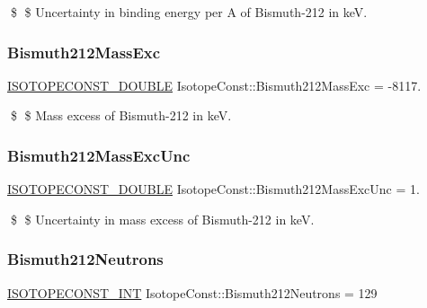 \$ \$ Uncertainty in binding energy per A of Bismuth-\/212 in keV. \mbox{\label{group___isotope_const-_bismuth-_bi212_ga6e482877de19ed5c54723f781240794a}} 
\subsubsection{\texorpdfstring{Bismuth212\+Mass\+Exc}{Bismuth212MassExc}}
{\footnotesize\ttfamily \mbox{\hyperlink{group___isotope_const-_macros_ga8f45a7272ce02c0b4c65c44636ed719a}{I\+S\+O\+T\+O\+P\+E\+C\+O\+N\+S\+T\+\_\+\+D\+O\+U\+B\+LE}} Isotope\+Const\+::\+Bismuth212\+Mass\+Exc = -\/8117.}

\$ \$ Mass excess of Bismuth-\/212 in keV. \mbox{\label{group___isotope_const-_bismuth-_bi212_ga92706bf4ef668699746b2578fed9eeef}} 
\subsubsection{\texorpdfstring{Bismuth212\+Mass\+Exc\+Unc}{Bismuth212MassExcUnc}}
{\footnotesize\ttfamily \mbox{\hyperlink{group___isotope_const-_macros_ga8f45a7272ce02c0b4c65c44636ed719a}{I\+S\+O\+T\+O\+P\+E\+C\+O\+N\+S\+T\+\_\+\+D\+O\+U\+B\+LE}} Isotope\+Const\+::\+Bismuth212\+Mass\+Exc\+Unc = 1.}

\$ \$ Uncertainty in mass excess of Bismuth-\/212 in keV. \mbox{\label{group___isotope_const-_bismuth-_bi212_gafde890acc72feb17eb33e141959ed41d}} 
\subsubsection{\texorpdfstring{Bismuth212\+Neutrons}{Bismuth212Neutrons}}
{\footnotesize\ttfamily \mbox{\hyperlink{group___isotope_const-_macros_ga5f18360b3e99483a35c32d789e62621c}{I\+S\+O\+T\+O\+P\+E\+C\+O\+N\+S\+T\+\_\+\+I\+NT}} Isotope\+Const\+::\+Bismuth212\+Neutrons = 129}


